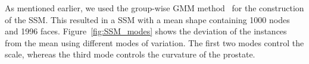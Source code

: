 \documentclass[journal]{IEEEtran}
\begin{document}
As mentioned earlier, we used the group-wise GMM method~\cite{Rasoulian12b} for the construction of the SSM. This resulted in a SSM with a mean shape containing 1000 nodes and 1996 faces. Figure~\ref{fig:SSM_modes} shows the deviation of the instances from the mean using different modes of variation. The first two modes control the scale, whereas the third mode controls the curvature of the prostate.

\begin{figure}[t]
	\centering
	 \hfill
	 \hfill
	\\
	 \hfill
	 \hfill

\end{figure}
\end{document}
